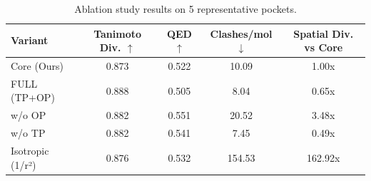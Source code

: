 \begin{table}[h]
\caption{Ablation study results on 5 representative pockets.}
\centering
\begin{tabular}{lcccc}
\hline
Variant & Tanimoto Div. $\uparrow$ & QED $\uparrow$ & Clashes/mol $\downarrow$ & Spatial Div. vs Core \\
\hline
Core (Ours) & 0.873 & 0.522 & 10.09 & 1.00x \\
FULL (TP+OP) & 0.888 & 0.505 & 8.04 & 0.65x \\
w/o OP & 0.882 & 0.551 & 20.52 & 3.48x \\
w/o TP & 0.882 & 0.541 & 7.45 & 0.49x \\
Isotropic (1/r²) & 0.876 & 0.532 & 154.53 & 162.92x \\
\hline
\end{tabular}
\label{tab:ablation}
\end{table}
